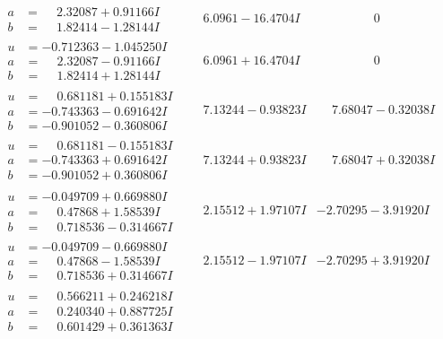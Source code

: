 \documentclass[1p]{elsarticle_modified}
\theoremstyle{definition}
\begin{document}
$$\begin{array}{c|c|c}
\begin{aligned}
a &= \phantom{-}2.32087 + 0.91166 I \\
b &= \phantom{-}1.82414 - 1.28144 I\end{aligned}
 & \phantom{-}6.0961 - 16.4704 I & \phantom{-0.000000 } 0 \\ \hline\begin{aligned}
u &= -0.712363 - 1.045250 I \\
a &= \phantom{-}2.32087 - 0.91166 I \\
b &= \phantom{-}1.82414 + 1.28144 I\end{aligned}
 & \phantom{-}6.0961 + 16.4704 I & \phantom{-0.000000 } 0 \\ \hline\begin{aligned}
u &= \phantom{-}0.681181 + 0.155183 I \\
a &= -0.743363 - 0.691642 I \\
b &= -0.901052 - 0.360806 I\end{aligned}
 & \phantom{-}7.13244 - 0.93823 I & \phantom{-}7.68047 - 0.32038 I \\ \hline\begin{aligned}
u &= \phantom{-}0.681181 - 0.155183 I \\
a &= -0.743363 + 0.691642 I \\
b &= -0.901052 + 0.360806 I\end{aligned}
 & \phantom{-}7.13244 + 0.93823 I & \phantom{-}7.68047 + 0.32038 I \\ \hline\begin{aligned}
u &= -0.049709 + 0.669880 I \\
a &= \phantom{-}0.47868 + 1.58539 I \\
b &= \phantom{-}0.718536 - 0.314667 I\end{aligned}
 & \phantom{-}2.15512 + 1.97107 I & -2.70295 - 3.91920 I \\ \hline\begin{aligned}
u &= -0.049709 - 0.669880 I \\
a &= \phantom{-}0.47868 - 1.58539 I \\
b &= \phantom{-}0.718536 + 0.314667 I\end{aligned}
 & \phantom{-}2.15512 - 1.97107 I & -2.70295 + 3.91920 I \\ \hline\begin{aligned}
u &= \phantom{-}0.566211 + 0.246218 I \\
a &= \phantom{-}0.240340 + 0.887725 I \\
b &= \phantom{-}0.601429 + 0.361363 I\end{aligned}

\end{array}$$
\end{document}
